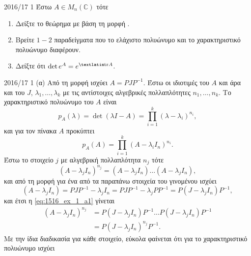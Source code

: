 \documentclass[a4paper,11pt]{article}
\begin{document}
\begin{exercise}{2016/17 1} Έστω \( A \in M_n(\mathbb{C}) \) τότε
    \begin{enumerate}[label=(\alph*)]
        \item Δείξτε το θεώρημα  με βάση τη μορφή .
        \item Βρείτε \( 1-2 \) παραδείγματα που το ελάχιστο πολυώνυμο και το
            χαρακτηριστικό πολυώνυμο διαφέρουν.
        \item Δείξτε ότι \( \det e^A = e^{\text{\tl{tr}}A} \).
    \end{enumerate}
\end{exercise}
\begin{solution}{2016/17 1}
    (α) Από τη μορφή  ισχύει \( A = PJP^{-1}\). Έστω οι
    ιδιοτιμές του \( A \) και άρα και του \( J \), \( \lambda_1, \dots,
    \lambda_k \) με τις αντίστοιχες αλγεβρικές πολλαπλότητες \( n_1, \dots, n_k
    \). Το χαρακτηριστικό πολυώνυμο του \( A \) είναι
    \begin{equation*}
        p_A(\lambda) = \det{(\lambda I - A)} = \prod_{i=1}^k(\lambda -
        \lambda_i)^{n_i},
    \end{equation*}
    και για τον πίνακα \( A \) προκύπτει
    \begin{equation*}
        p_A(A) = \prod_{i=1}^k(A - \lambda_iI_n)^{n_i}.
    \end{equation*}
    Έστω το στοιχείο \( j \) με αλγεβρική πολλαπλότητα \( n_j \) τότε
    \begin{equation}\label{eq:1516_ex_1_a1}
        (A - \lambda_j I_n)^{n_j} = (A - \lambda_j I_n) \dots (A - \lambda_j
        I_n),
    \end{equation}
    και από τη μορφή  για ένα από τα παραπάνω στοιχεία του γινομένου
    ισχύει
    \begin{equation*}
        (A - \lambda_j I_n) = PJP^{-1} - \lambda_j I_n = PJP^{-1} - \lambda_j
        PP^{-1} = P(J - \lambda_j I_n)P^{-1},
    \end{equation*}
    και έτσι η \eqref{eq:1516_ex_1_a1} γίνεται
    \begin{align*}
        (A - \lambda_j I_n)^{n_j} &= P(J - \lambda_j I_n)P^{-1} \dots P(J -
        \lambda_j I_n)P^{-1} \\
        &=P(J - \lambda_j I_n)^{n_j}P^{-1}.
    \end{align*}
    Με την ίδια διαδικασία για κάθε στοιχείο, εύκολα φαίνεται ότι για το
    χαρακτηριστικό πολυώνυμο ισχύει
    \begin{equation*}

\end{equation*}
\end{solution}
\end{document}
